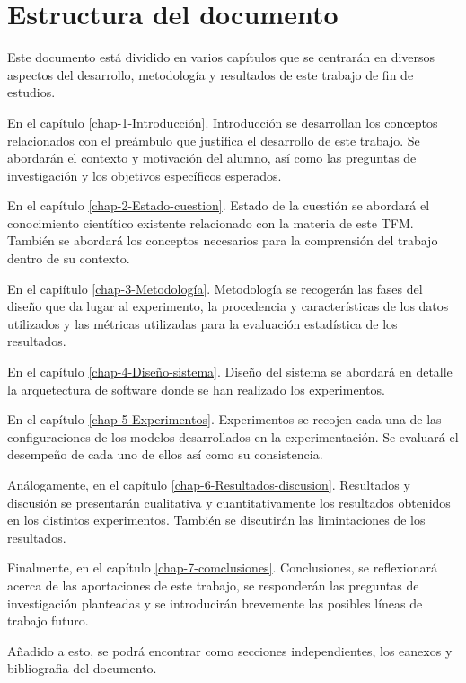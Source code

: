\section{Estructura del documento}
Este documento está dividido en varios capítulos que se centrarán en diversos aspectos del desarrollo, metodología y resultados de este trabajo de fin de estudios. 

En el capítulo \ref{chap-1-Introducción}. Introducción se desarrollan los conceptos relacionados con el preámbulo que justifica el desarrollo de este trabajo. Se abordarán el contexto y motivación del alumno, así como las preguntas de investigación y los objetivos específicos esperados.

En el capítulo \ref{chap-2-Estado-cuestion}. Estado de la cuestión se abordará el conocimiento cientítico existente relacionado con la materia de este TFM. También se abordará los conceptos necesarios para la comprensión del trabajo dentro de su contexto.

En el capiítulo \ref{chap-3-Metodología}. Metodología se recogerán las fases del diseño que da lugar al experimento, la procedencia y características de los datos utilizados y las métricas utilizadas para la evaluación estadística de los resultados.

En el capítulo \ref{chap-4-Diseño-sistema}. Diseño del sistema se abordará en detalle la arquetectura de software donde se han realizado los experimentos.

En el capítulo \ref{chap-5-Experimentos}. Experimentos se recojen cada una de las configuraciones de los modelos desarrollados en la experimentación. Se evaluará el desempeño de cada uno de ellos así como su consistencia.

Análogamente, en el capítulo \ref{chap-6-Resultados-discusion}. Resultados y discusión se presentarán cualitativa y cuantitativamente los resultados obtenidos en los distintos experimentos. También se discutirán las limintaciones de los resultados.

Finalmente, en el capítulo \ref{chap-7-comclusiones}. Conclusiones, se reflexionará acerca de las aportaciones de este trabajo, se responderán las preguntas de investigación planteadas y se introducirán brevemente las posibles líneas de trabajo futuro.

Añadido a esto, se podrá encontrar como secciones independientes, los eanexos y bibliografia del documento.